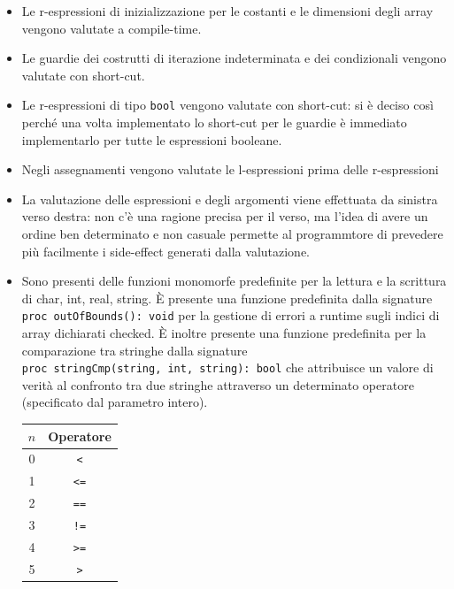 \documentclass{report}
\newcommand{\term}[1]{\texttt{#1}}
\begin{document}
\begin{itemize}
    \item Le r-espressioni di inizializzazione per le costanti e le dimensioni degli array
        vengono valutate a compile-time.
    
    \item Le guardie dei costrutti di iterazione indeterminata e dei condizionali vengono valutate
        con short-cut.
    
    \item Le r-espressioni di tipo \term{bool} vengono valutate con short-cut: si è deciso così
        perché una volta implementato lo short-cut per le guardie è immediato implementarlo per
        tutte le espressioni booleane.
    
    \item Negli assegnamenti vengono valutate le l-espressioni prima delle r-espressioni
    
    \item La valutazione delle espressioni e degli argomenti viene effettuata da sinistra verso destra:
        non c'è una ragione precisa per il verso, ma l'idea di avere un ordine ben determinato e non
        casuale permette al programmtore di prevedere più facilmente i side-effect generati dalla
        valutazione.

    \item Sono presenti delle funzioni monomorfe predefinite per la lettura e la scrittura di 
        char, int, real, string. È presente una funzione predefinita dalla signature
        \term{proc outOfBounds(): void} per la gestione di errori a runtime sugli indici di array
        dichiarati checked. È inoltre presente una funzione predefinita per la comparazione
        tra stringhe dalla signature \\\term{proc~stringCmp(string,~int,~string):~bool} che attribuisce
        un valore di verità al confronto tra due stringhe attraverso un determinato operatore
        (specificato dal parametro intero).
        \begin{center}
        \begin{tabular}{ | c | c | }
            \hline
            $n$     &   \textbf{Operatore}  \\
            \hline
            0       &   \term{<}            \\
            \hline
            1       &   \term{<=}           \\
            \hline
            2       &   \term{==}           \\
            \hline
            3       &   \term{!=}           \\
            \hline
            4       &   \term{>=}           \\
            \hline
            5       &   \term{>}            \\
            \hline
            

\end{tabular}
\end{center}
\end{itemize}
\end{document}
